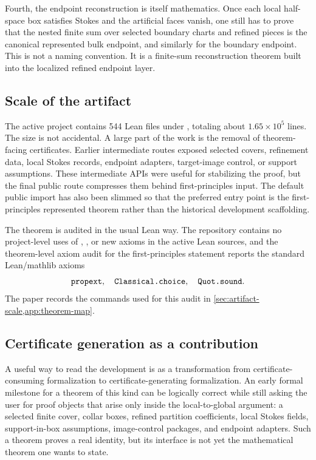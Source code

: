 Fourth, the endpoint reconstruction is itself mathematics.  Once each local
half-space box satisfies Stokes and the artificial faces vanish, one still has
to prove that the nested finite sum over selected boundary charts and refined
pieces is the canonical represented bulk endpoint, and similarly for the
boundary endpoint.  This is not a naming convention.  It is a finite-sum
reconstruction theorem built into the localized refined endpoint layer.

\subsection{Scale of the artifact}

The active project contains 544 Lean files under , totaling about
\(1.65\times 10^5\) lines.  The size is not accidental.  A large part of the
work is the removal of theorem-facing certificates.  Earlier intermediate
routes exposed selected covers, refinement data, local Stokes records,
endpoint adapters, target-image control, or support assumptions.  These
intermediate APIs were useful for stabilizing the proof, but the final public
route compresses them behind first-principles input.  The default public import
has also been slimmed so that the preferred entry point is the first-principles
represented theorem rather than the historical development scaffolding.

The theorem is audited in the usual Lean way.  The repository contains no
project-level uses of , , or new axioms in the active
Lean sources, and the theorem-level axiom audit for the first-principles
statement reports the standard Lean/mathlib axioms
\[
\code{propext},\quad \code{Classical.choice},\quad \code{Quot.sound}.
\]
The paper records the commands used for this audit in
\cref{sec:artifact-scale,app:theorem-map}.

\subsection{Certificate generation as a contribution}

A useful way to read the development is as a transformation from
certificate-consuming formalization to certificate-generating formalization.
An early formal milestone for a theorem of this kind can be logically correct
while still asking the user for proof objects that arise only inside the
local-to-global argument: a selected finite cover, collar boxes, refined
partition coefficients, local Stokes fields, support-in-box assumptions,
image-control packages, and endpoint adapters.  Such a theorem proves a real
identity, but its interface is not yet the mathematical theorem one wants to
state.

